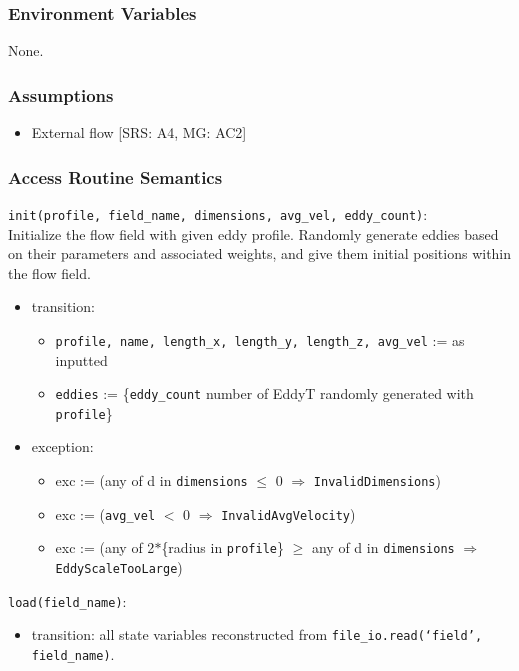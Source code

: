 \documentclass[12pt, titlepage]{article}
\begin{document}
\subsubsection{Environment Variables}
None.

\subsubsection{Assumptions}
\begin{itemize}
  \item External flow [SRS: A4, MG: AC2]
\end{itemize}

\subsubsection{Access Routine Semantics}

\noindent \texttt{init(profile, field\_name, dimensions, avg\_vel, eddy\_count)}:\\
Initialize the flow field with given eddy profile. Randomly generate eddies based on their parameters and associated weights, and give them initial positions within the flow field.
\begin{itemize}
\item transition: 
  \begin{itemize}
    \item \texttt{profile, name, length\_x, length\_y, length\_z, avg\_vel} := as inputted
    \item \texttt{eddies} := \{\texttt{eddy\_count} number of EddyT randomly generated with \texttt{profile}\}
  \end{itemize}
\item exception: 
  \begin{itemize}
    \item exc := (any of d in \texttt{dimensions} $\le$ 0 $\Rightarrow$ \texttt{InvalidDimensions})
    \item exc := (\texttt{avg\_vel} $<$ 0 $\Rightarrow$ \texttt{InvalidAvgVelocity})
    \item exc := (any of 2$*$\{radius in \texttt{profile}\} $\ge$ any of d in \texttt{dimensions} $\Rightarrow$ \texttt{EddyScaleTooLarge})
  \end{itemize}
\end{itemize}

\noindent \texttt{load(field\_name)}:
\begin{itemize}
  \item transition: all state variables reconstructed from \texttt{file\_io.read(`field', field\_name)}.
\end{itemize}
\end{document}
